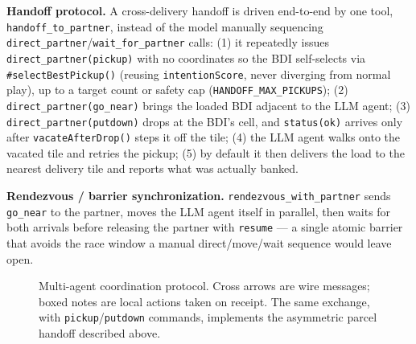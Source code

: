 \documentclass[11pt,a4paper]{article}
\renewcommand{\paragraph}[1]{\par\smallskip\noindent\textbf{#1}}
\begin{document}
\paragraph{Handoff protocol.} A cross-delivery handoff is driven end-to-end by one tool,
\texttt{handoff\_to\_partner}, instead of the model manually sequencing
\texttt{direct\_partner}/\texttt{wait\_for\_partner} calls: (1) it repeatedly issues
\texttt{direct\_partner(pickup)} with no coordinates so the BDI self-selects via
\texttt{\#selectBestPickup()} (reusing \texttt{intentionScore}, never diverging from normal
play), up to a target count or safety cap (\texttt{HANDOFF\_MAX\_PICKUPS}); (2)
\texttt{direct\_partner(go\_near)} brings the loaded BDI adjacent to the LLM agent; (3)
\texttt{direct\_partner(putdown)} drops at the BDI's cell, and \texttt{status(ok)} arrives only
after \texttt{vacateAfterDrop()} steps it off the tile; (4) the LLM agent walks onto the vacated
tile and retries the pickup; (5) by default it then delivers the load to the nearest delivery
tile and reports what was actually banked.

\paragraph{Rendezvous / barrier synchronization.} \texttt{rendezvous\_with\_partner} sends
\texttt{go\_near} to the partner, moves the LLM agent itself in parallel, then waits for both
arrivals before releasing the partner with \texttt{resume} --- a single atomic barrier that
avoids the race window a manual direct/move/wait sequence would leave open.

\begin{figure}[htbp]
\centering
{}
\caption{Multi-agent coordination protocol. Cross arrows are wire messages; boxed notes are
local actions taken on receipt. The same exchange, with \texttt{pickup}/\texttt{putdown}
commands, implements the asymmetric parcel handoff described above.}
\label{fig:coord-protocol}
\end{figure}
\end{document}
